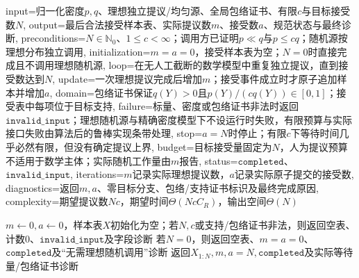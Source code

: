 \begin{AlgorithmContract}{
  input={归一化密度$p,q$、理想独立提议/均匀源、全局包络证书、有限$c$与目标接受数$N$},
  output={最后合法接受样本表、实际提议数$m$、接受数$a$、规范状态与最终诊断},
  preconditions={$N\in\mathbb N_0$、$1\le c<\infty$；调用方已证明$p\ll q$与$p\le cq$；随机源按理想分布独立调用},
  initialization={$m=a=0$，接受样本表为空；$N=0$时直接完成且不调用理想随机源},
  loop={在无人工截断的数学模型中重复独立提议，直到接受数达到$N$},
  update={一次理想提议完成后增加$m$；接受事件成立时才原子追加样本并增加$a$},
  domain={包络证书保证$q(Y)>0$且$p(Y)/(cq(Y))\in[0,1]$；接受表中每项位于目标支持},
  failure={标量、密度或包络证书非法时返回$\mathtt{invalid\_input}$；理想随机源与精确密度模型下不设运行时失败，有限预算与实际接口失败由算法后的鲁棒实现条带处理},
  stop={$a=N$时停止；有限$c$下等待时间几乎必然有限，但没有确定提议上界},
  budget={目标接受量固定为$N$，人为提议预算不适用于数学主体；实际随机工作量由$m$报告},
  status={$\mathtt{completed}$、$\mathtt{invalid\_input}$},
  iterations={$m$记录实际理想提议数，$a$记录实际原子提交的接受数},
  diagnostics={返回$m,a$、零目标分支、包络/支持证书标识及最终完成原因},
  complexity={期望提议数$Nc$，期望时间$\Theta(NcC_R)$，输出空间$\Theta(N)$}
}
\begin{algorithm}[!t]
\caption{接受—拒绝抽样的数学主体}\label{alg:V5-C02-rejection-math}\label{alg:V5-C02-rejection-budget}
$m\leftarrow0,a\leftarrow0$，样本表$X$初始化为空；若$N,c$或支持/包络证书非法，则返回空表、计数$0$、$\mathtt{invalid\_input}$及字段诊断\;
若$N=0$，则返回空表、$m=a=0$、$\mathtt{completed}$及“无需理想随机调用”诊断\;
返回$X_{1:N},m,a=N,\mathtt{completed}$及实际等待量/包络证书诊断\;
\end{algorithm}
\end{AlgorithmContract}
\endgroup


